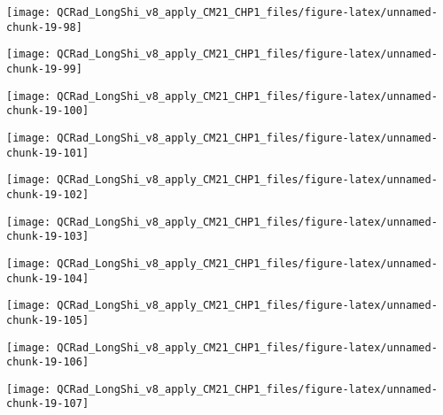 \documentclass[
  10pt,
  a4paper,oneside]{article}
\begin{document}
\begin{center}\texttt{[image: QCRad\_LongShi\_v8\_apply\_CM21\_CHP1\_files/figure-latex/unnamed-chunk-19-98]} \end{center}

\begin{center}\texttt{[image: QCRad\_LongShi\_v8\_apply\_CM21\_CHP1\_files/figure-latex/unnamed-chunk-19-99]} \end{center}

\begin{center}\texttt{[image: QCRad\_LongShi\_v8\_apply\_CM21\_CHP1\_files/figure-latex/unnamed-chunk-19-100]} \end{center}

\begin{center}\texttt{[image: QCRad\_LongShi\_v8\_apply\_CM21\_CHP1\_files/figure-latex/unnamed-chunk-19-101]} \end{center}

\begin{center}\texttt{[image: QCRad\_LongShi\_v8\_apply\_CM21\_CHP1\_files/figure-latex/unnamed-chunk-19-102]} \end{center}

\begin{center}\texttt{[image: QCRad\_LongShi\_v8\_apply\_CM21\_CHP1\_files/figure-latex/unnamed-chunk-19-103]} \end{center}

\begin{center}\texttt{[image: QCRad\_LongShi\_v8\_apply\_CM21\_CHP1\_files/figure-latex/unnamed-chunk-19-104]} \end{center}

\begin{center}\texttt{[image: QCRad\_LongShi\_v8\_apply\_CM21\_CHP1\_files/figure-latex/unnamed-chunk-19-105]} \end{center}

\begin{center}\texttt{[image: QCRad\_LongShi\_v8\_apply\_CM21\_CHP1\_files/figure-latex/unnamed-chunk-19-106]} \end{center}

\begin{center}\texttt{[image: QCRad\_LongShi\_v8\_apply\_CM21\_CHP1\_files/figure-latex/unnamed-chunk-19-107]} \end{center}
\end{document}
